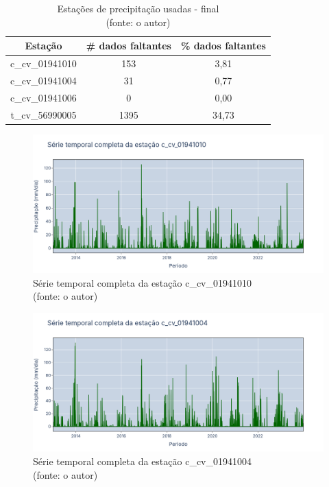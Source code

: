 \begin{table}[h!]
	\centering \small
	\caption{Estações de precipitação usadas - final \\(fonte: o autor)}
	\begin{tabular}{|c|c|c|} \hline
		\textbf{Estação} & \textbf{\# dados faltantes} & \textbf{\% dados faltantes} \\ \hline
		c\_cv\_01941010  & 153                         & 3,81 \\ \hline
		c\_cv\_01941004  & 31                          & 0,77 \\ \hline
		c\_cv\_01941006  & 0                           & 0,00 \\ \hline
		t\_cv\_56990005  & 1395                        & 34,73 \\ \hline
	\end{tabular}
	\label{tab:estacoes_chuva_usadas_final_rio_doce}
\end{table}

\begin{figure}[!h]
	\centering
	\includegraphics[scale=0.25]{Figuras/rio_doce/doceSerieCompleta_c_cv_01941010.png}
	\caption{Série temporal completa da estação c\_cv\_01941010\\(fonte: o autor)}
	\label{fig:doceSerieCompleta_c_cv_01941010}
\end{figure}

\begin{figure}[!h]
	\centering
	\includegraphics[scale=0.25]{Figuras/rio_doce/doceSerieCompleta_c_cv_01941004.png}
	\caption{Série temporal completa da estação c\_cv\_01941004\\(fonte: o autor)}
	\label{fig:doceSerieCompleta_c_cv_01941004}
\end{figure}

